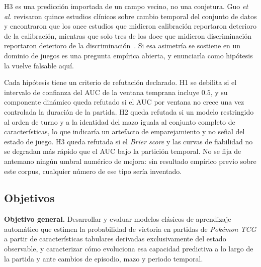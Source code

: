 \documentclass[conference]{IEEEtran}
\begin{document}
\noindent H3 es una predicci\'on importada de un campo vecino, no una
conjetura. Guo \textit{et al.} revisaron quince estudios cl\'inicos sobre
cambio temporal del conjunto de datos y encontraron que los once estudios
que midieron calibraci\'on reportaron deterioro de la calibraci\'on,
mientras que solo tres de los doce que midieron discriminaci\'on
reportaron deterioro de la
discriminaci\'on~\cite{guo_temporalshift_2021}. Si esa asimetr\'ia se
sostiene en un dominio de juegos es una pregunta emp\'irica abierta, y
enunciarla como hip\'otesis la vuelve falsable aqu\'i.

Cada hip\'otesis tiene un criterio de refutaci\'on declarado. H1 se debilita
si el intervalo de confianza del AUC de la ventana temprana incluye $0.5$,
y su componente din\'amico queda refutado si el AUC por ventana no crece
una vez controlada la duraci\'on de la partida. H2 queda refutada si un
modelo restringido al orden de turno y a la identidad del mazo iguala al
conjunto completo de caracter\'isticas, lo que indicar\'ia un artefacto de
emparejamiento y no se\~nal del estado de juego. H3 queda refutada si el
\emph{Brier score} y las curvas de fiabilidad no se degradan m\'as
r\'apido que el AUC bajo la partici\'on temporal. No se fija de antemano
ning\'un umbral num\'erico de mejora: sin resultado emp\'irico previo sobre
este corpus, cualquier n\'umero de ese tipo ser\'ia inventado.

\subsection{Objetivos}
\label{subsec:objectives}
\textbf{Objetivo general.} Desarrollar y evaluar modelos cl\'asicos de
aprendizaje autom\'atico que estimen la probabilidad de victoria en
partidas de \emph{Pok\'emon TCG} a partir de caracter\'isticas tabulares
derivadas exclusivamente del estado observable, y caracterizar c\'omo
evoluciona esa capacidad predictiva a lo largo de la partida y ante
cambios de episodio, mazo y periodo temporal.
\end{document}
